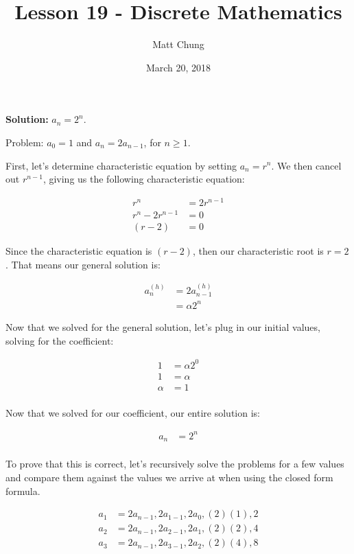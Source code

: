 \documentclass{article}
\title{Lesson 19 - Discrete Mathematics}
\author{Matt Chung}
\date{March 20, 2018}
\begin{document}
\maketitle

\section{}

\textbf{Solution:} $a_n = 2^n$.

Problem: $a_0 = 1$ and $a_n = 2a_{n-1}$, for $n \ge 1$.

First, let's determine characteristic equation by setting $a_n = r^n$. We then cancel out $r^{n-1}$, giving us the following characteristic equation:

\begin{align*}
    r^n &= 2r^{n-1} \\
    r^n - 2r^{n-1} &= 0 \\
    (r-2) &= 0
\end{align*}

Since the characteristic equation is $(r-2)$, then our characteristic root is $r=2$. That means our general solution is:

\begin{align*}
a^{(h)}_n &= 2a^{(h)}_{n-1} \\
          &= \alpha2^n
\end{align*}

Now that we solved for the general solution, let's plug in our initial values, solving for the coefficient:

\begin{align*}
1 &= \alpha2^0 \\
1 &= \alpha \\
\alpha &= 1 \\
\end{align*}

Now that we solved for our coefficient, our entire solution is:

\begin{align*}
a_n &= 2^n \\
\end{align*}

To prove that this is correct, let's recursively solve the problems for a few values and compare them against the values we arrive at when using the closed form formula.

\begin{align*}
a_1 &= 2a_{n-1}, 2a_{1-1}, 2a_0, (2)(1), 2\\
a_2 &= 2a_{n-1}, 2a_{2-1}, 2a_1, (2)(2), 4\\
a_3 &= 2a_{n-1}, 2a_{3-1}, 2a_2, (2)(4), 8\\
\end{align*}
\end{document}
